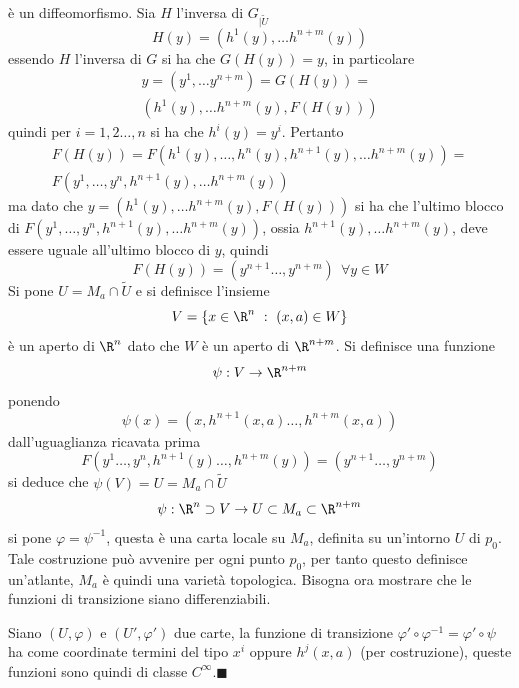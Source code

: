 \documentclass[10pt, letterpaper]{report}
\begin{document}
è un diffeomorfismo. Sia $H$ l'inversa di $G_{|\tilde U}$\begin{equation}
    H(y)=(h^1(y),\dots h^{n+m}(y))
\end{equation}
essendo $H$ l'inversa di $G$ si ha che $G(H(y))=y$, in particolare\begin{eqnarray}
    y=(y^1,\dots y^{n+m})=G(H(y))=\\(h^1(y),\dots h^{n+m}(y),F(H(y)))
\end{eqnarray}
quindi per $i=1,2\dots,n$ si ha che $h^i(y)=y^i$. Pertanto\begin{eqnarray}
    F(H(y))=F(h^1(y),\dots,h^n(y),h^{n+1}(y),\dots h^{n+m}(y))=\\ 
    F(y^1,\dots,y^n,h^{n+1}(y),\dots h^{n+m}(y))
\end{eqnarray}
ma dato che $y=(h^1(y),\dots h^{n+m}(y),F(H(y)))$ si ha che l'ultimo blocco di $F(y^1,\dots,y^n,h^{n+1}(y),\dots h^{n+m}(y))$, ossia $h^{n+1}(y),\dots h^{n+m}(y)$, deve essere uguale all'ultimo blocco di $y$, quindi \begin{equation}
    F(H(y))=(y^{n+1}\dots, y^{n+m}) \ \ \forall y\in W
\end{equation}
Si pone $U=M_a\cap\tilde U$ e si definisce l'insieme \begin{equation}
    V=\{x\in\R^n \ : \ (x,a)\in W\}
\end{equation}
è un aperto di $\R^{n}$ dato che $W$ è un aperto di $\R^{n+m}$. Si definisce una funzione \begin{equation}
    \psi:V\rightarrow\R^{n+m}
\end{equation}
ponendo\begin{equation}
    \psi(x)=(x,h^{n+1}(x,a)\dots,h^{n+m}(x,a))
\end{equation}
dall'uguaglianza ricavata prima \begin{equation}
    F(y^1\dots,y^n,h^{n+1}(y)\dots ,h^{n+m}(y))=(y^{n+1}\dots,y^{n+m})
\end{equation}
si deduce che $\psi(V)=U=M_a\cap\tilde U$\begin{equation}
    \psi:\R^n\supset V \rightarrow U \subset M_a\subset\R^{n+m}
\end{equation}
si pone $\varphi=\psi^{-1}$, questa è una carta locale su $M_a$, definita su un'intorno $U$ di $p_0$. Tale costruzione può avvenire per ogni punto $p_0$, per tanto questo definisce un'atlante, $M_a$ è quindi una varietà topologica. Bisogna ora mostrare che le funzioni di transizione siano differenziabili.\bigskip

Siano $(U,\varphi)$ e $(U',\varphi')$ due carte, la funzione di transizione 
$\varphi'\circ\varphi^{-1}=\varphi'\circ\psi$ ha come coordinate termini del tipo $x^i$ oppure $h^j(x,a)$ (per 
costruzione), queste funzioni sono quindi di classe $C^\infty$.\hfill$\blacksquare$\bigskip
\end{document}
